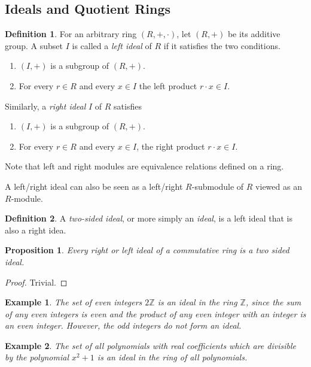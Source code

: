 \documentclass{article}
\newtheorem{proposition}[theorem]{Proposition}
\newtheorem{example}{Example}[section]
\theoremstyle{remark}
\theoremstyle{definition}
\newtheorem{definition}{Definition}[section]
\begin{document}
\subsection{Ideals and Quotient Rings}
\begin{definition}
For an arbitrary ring $(R,+, \cdot)$, let $(R, +)$ be its additive group. A subset $I$ is called a \textit{left ideal} of $R$ if it satisfies the two conditions. 
\begin{enumerate}
    \item $(I, +)$ is a subgroup of $(R, +)$. 
    \item For every $r \in R$ and every $x \in I$ the left product $r \cdot x \in I$. 
\end{enumerate}
Similarly, a \textit{right ideal} $I$ of $R$ satisfies
\begin{enumerate}
    \item $(I, +)$ is a subgroup of $(R, +)$. 
    \item For every $r \in R$ and every $x \in I$, the right product $r \cdot x \in I$. 
\end{enumerate}
Note that left and right modules are equivalence relations defined on a ring. 
\end{definition}

A left/right ideal can also be seen as a left/right $R$-submodule of $R$ viewed as an $R$-module. 

\begin{definition}
A \textit{two-sided ideal}, or more simply an \textit{ideal}, is a left ideal that is also a right idea. 
\end{definition}

\begin{proposition}
Every right or left ideal of a commutative ring is a two sided ideal. 
\end{proposition}
\begin{proof}
Trivial. 
\end{proof}

\begin{example}
The set of even integers $2 \mathbb{Z}$ is an ideal in the ring $\mathbb{Z}$, since the sum of any even integers is even and the product of any even integer with an integer is an even integer. However, the odd integers do not form an ideal. 
\end{example}

\begin{example}
The set of all polynomials with real coefficients which are divisible by the polynomial $x^2 + 1$ is an ideal in the ring of all polynomials. 
\end{example}
\end{document}
